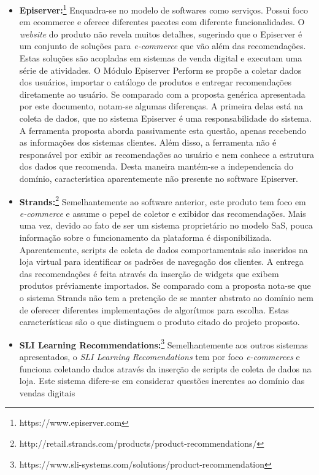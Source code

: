 \documentclass[
	12pt,				%
    oneside,			%
	a4paper,			%
	english,			%
	french,				%
	spanish,			%
	brazil,				%
	]{abntex2}
\begin{document}
\begin{itemize}
	\item \textbf{Episerver:}\footnote{https://www.episerver.com} Enquadra-se no modelo de softwares como serviços. Possui foco em ecommerce e oferece diferentes pacotes com diferente funcionalidades. O 
	\textit{website} do produto não revela muitos detalhes, sugerindo que o Episerver é um conjunto de soluções para \textit{e-commerce} que vão além das recomendações. Estas soluções são acopladas em
	sistemas de venda digital e executam uma série de atividades. O Módulo Episerver Perform se propõe a coletar dados dos usuários, importar o catálogo de produtos e entregar recomendações diretamente
	ao usuário. Se comparado com a proposta genérica apresentada por este documento, notam-se algumas diferenças. A primeira delas está na coleta de dados, que no sistema Episerver é uma responsabilidade 
	do sistema. A ferramenta proposta aborda passivamente esta questão, apenas recebendo as informações dos sistemas clientes. Além disso, a ferramenta não é responsável por exibir as recomendações ao usuário
	e nem conhece a estrutura dos dados que recomenda. Desta maneira mantém-se a independencia do domínio, característica aparentemente não presente no software Episerver.
	\item \textbf{Strands:}\footnote{http://retail.strands.com/products/product-recommendations/} Semelhantemente ao software anterior, este produto tem foco em \textit{e-commerce} e assume o pepel de coletor
	e exibidor das recomendações. Mais uma vez, devido ao fato de ser um sistema proprietário no modelo SaS, pouca informação sobre o funcionamento da plataforma é disponibilizada. Aparentemente, scripts
	de coleta de dados comportamentais são inseridos na loja virtual para identificar os padrões de navegação dos clientes. A entrega das recomendações é feita através da inserção de widgets que exibem
	produtos préviamente importados. Se comparado com a proposta nota-se que o sistema Strands não tem a pretenção de se manter abstrato ao domínio nem de oferecer diferentes implementações de algorítmos para escolha.
	Estas características são o que distinguem o produto citado do projeto proposto.
	\item \textbf{SLI Learning Recommendations:}\footnote{https://www.sli-systems.com/solutions/product-recommendation} Semelhantemente aos outros sistemas apresentados, o \textit{SLI Learning Recomendations} 
	tem por foco \textit{e-commerces} e funciona coletando dados através da inserção de scripts de coleta de dados na loja. Este sistema difere-se em considerar questões inerentes ao domínio das vendas digitais

\end{itemize}
\end{document}
